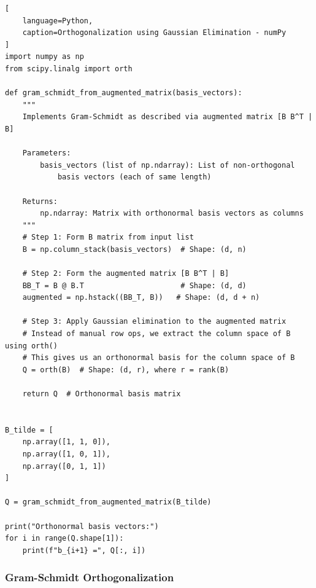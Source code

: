 \begin{lstlisting}[
    language=Python,
    caption=Orthogonalization using Gaussian Elimination - numPy
]
import numpy as np
from scipy.linalg import orth

def gram_schmidt_from_augmented_matrix(basis_vectors):
    """
    Implements Gram-Schmidt as described via augmented matrix [B B^T | B]

    Parameters:
        basis_vectors (list of np.ndarray): List of non-orthogonal 
            basis vectors (each of same length)

    Returns:
        np.ndarray: Matrix with orthonormal basis vectors as columns
    """
    # Step 1: Form B matrix from input list
    B = np.column_stack(basis_vectors)  # Shape: (d, n)

    # Step 2: Form the augmented matrix [B B^T | B]
    BB_T = B @ B.T                      # Shape: (d, d)
    augmented = np.hstack((BB_T, B))   # Shape: (d, d + n)

    # Step 3: Apply Gaussian elimination to the augmented matrix
    # Instead of manual row ops, we extract the column space of B using orth()
    # This gives us an orthonormal basis for the column space of B
    Q = orth(B)  # Shape: (d, r), where r = rank(B)

    return Q  # Orthonormal basis matrix


B_tilde = [
    np.array([1, 1, 0]),
    np.array([1, 0, 1]),
    np.array([0, 1, 1])
]

Q = gram_schmidt_from_augmented_matrix(B_tilde)

print("Orthonormal basis vectors:")
for i in range(Q.shape[1]):
    print(f"b_{i+1} =", Q[:, i])
\end{lstlisting}







\subsubsection{Gram-Schmidt Orthogonalization}


